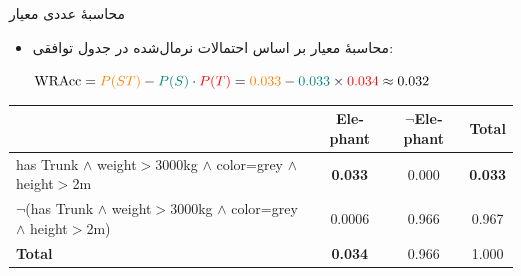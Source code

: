 \begin{frame}{محاسبهٔ عددی معیار }{}
\begin{itemize}\setlength{\itemsep}{4pt}
    \item محاسبهٔ معیار بر اساس احتمالات نرمال‌شده در جدول توافقی:
    \begin{center}
    \begin{latin}
    $\mathrm{WRAcc} = {\color{orange}P(ST)} - {\color{teal}P(S)} \cdot {\color{red}P(T)} = {\color{orange}0.033} - {\color{teal}0.033} \times {\color{red}0.034} \approx 0.032$
    \end{latin}
    \end{center}
\end{itemize}

\begin{center}
\begin{latin}
\setlength{\tabcolsep}{5pt}
\fontsize{8}{10}\selectfont
\begin{tabular}{|p{5.5cm}|c|c|c|}
\hline
\rowcolor{mannheimblue!15}
 & \textbf{Elephant} & \textbf{$\neg$Elephant} & \textbf{Total} \\ \hline
\raggedright has Trunk $\wedge$ weight$>$3000kg $\wedge$ color=grey $\wedge$ height$>$2m & \textbf{\color{orange}0.033} & 0.000 & \textbf{\color{teal}0.033} \\ \hline
\raggedright $\neg$(has Trunk $\wedge$ weight$>$3000kg $\wedge$ color=grey $\wedge$ height$>$2m) & 0.0006 & 0.966 & 0.967 \\ \hline
\textbf{Total} & \textbf{\color{red}0.034} & 0.966 & 1.000 \\ \hline
\end{tabular}
\end{latin}
\end{center}
\end{frame}

